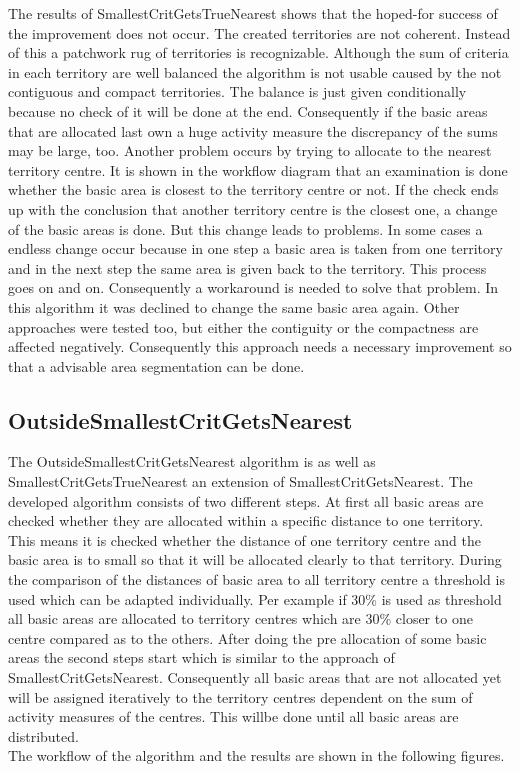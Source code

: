 \newpage
The results of SmallestCritGetsTrueNearest shows that the hoped-for success of the improvement does not occur. The created territories are not coherent. Instead of this a patchwork rug of territories is recognizable. Although the sum of criteria in each territory are well balanced the algorithm is not usable caused by the not contiguous and compact territories. The balance is just given conditionally because no check of it will be done at the end. Consequently if the basic areas that are allocated last own a huge activity measure the discrepancy of the sums may be large, too. Another problem occurs by trying to allocate to the nearest territory centre. It is shown in the workflow diagram that an examination is done whether the basic area is closest to the territory centre or not. If the check ends up with the conclusion that another territory centre is the closest one, a change of the basic areas is done. But this change leads to problems. In some cases a endless change occur because in one step a basic area is taken from one territory and in the next step the same area is given back to the territory. This process goes on and on. Consequently a workaround is needed to solve that problem. In this algorithm it was declined to change the same basic area again. Other approaches were tested too, but either the contiguity or the compactness are affected negatively. Consequently this approach needs a necessary improvement so that a advisable area segmentation can be done.


\subsection{OutsideSmallestCritGetsNearest}

The OutsideSmallestCritGetsNearest algorithm is as well as SmallestCritGetsTrueNearest an extension of SmallestCritGetsNearest. The developed algorithm consists of two different steps. At first all basic areas are checked whether they are allocated within a specific distance to one territory. This means it is checked whether the distance of one territory centre and the basic area is to small so that it will be allocated clearly to that territory. During the comparison of the distances of basic area to all territory centre a threshold is used which can be adapted individually. Per example if 30\% is used as threshold all basic areas are allocated to territory centres which are 30\% closer to one centre compared as to the others. After doing the pre allocation of some basic areas the second steps start which is similar to the approach of SmallestCritGetsNearest. Consequently all basic areas that are not allocated yet will be assigned iteratively to the territory centres dependent on the sum of activity measures of the centres. This willbe done until all basic areas are distributed.\\
The workflow of the algorithm and the results are shown in the following figures.

